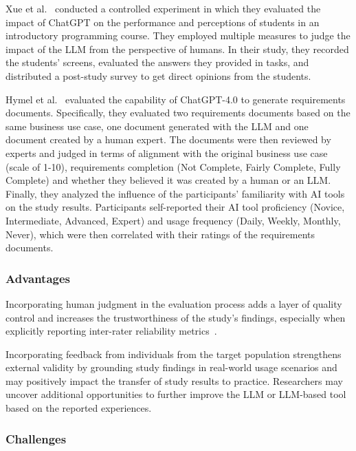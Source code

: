 Xue et al.~\cite{DBLP:conf/icse/XueCBTH24} conducted a controlled experiment in which they evaluated the impact of ChatGPT on the performance and perceptions of students in an introductory programming course.
They employed multiple measures to judge the impact of the LLM from the perspective of humans.
In their study, they recorded the students' screens, evaluated the answers they provided in tasks, and distributed a post-study survey to get direct opinions from the students.

Hymel et al.~\cite{hymel2025analysisllmsvshuman} evaluated the capability of ChatGPT-4.0 to generate requirements documents. 
Specifically, they evaluated two requirements documents based on the same business use case, one document generated with the LLM and one document created by a human expert.
The documents were then reviewed by experts and judged in terms of alignment with the original business use case (scale of 1-10), requirements completion (Not Complete, Fairly Complete, Fully Complete) and whether they believed it was created by a human or an LLM.
Finally, they analyzed the influence of the participants' familiarity with AI tools on the study results.
Participants self-reported their AI tool proficiency (Novice, Intermediate, Advanced, Expert) and usage frequency (Daily, Weekly, Monthly, Never), which were then correlated with their ratings of the requirements documents.


\subsubsection{Advantages}

Incorporating human judgment in the evaluation process adds a layer of quality control and increases the trustworthiness of the study's findings, especially when explicitly reporting inter-rater reliability metrics~\cite{khraisha2024canlargelanguagemodelshumans}.

Incorporating feedback from individuals from the target population strengthens external validity by grounding study findings in real-world usage scenarios and may positively impact the transfer of study results to practice.
Researchers may uncover additional opportunities to further improve the LLM or LLM-based tool based on the reported experiences.

\subsubsection{Challenges}

